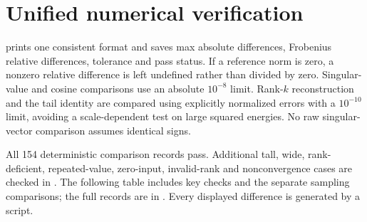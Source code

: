 \documentclass[11pt]{article}
\newcommand{\VerificationCount}{154}
\begin{document}
\section{Unified numerical verification}
 prints one consistent format and saves
max absolute differences, Frobenius relative differences, tolerance and
pass status. If a reference norm is zero, a nonzero relative difference
is left undefined rather than divided by zero.
Singular-value and cosine comparisons use an absolute $10^{-8}$ limit.
Rank-$k$ reconstruction and the tail identity are compared using
explicitly normalized errors with a $10^{-10}$ limit, avoiding a
scale-dependent test on large squared energies. No raw singular-vector
comparison assumes identical signs.

All \VerificationCount{} deterministic comparison records pass.
Additional tall, wide, rank-deficient, repeated-value, zero-input,
invalid-rank and nonconvergence cases are checked in
. The following table includes key checks
and the separate sampling comparisons; the full records are in
.
Every displayed difference is generated by a script.
\end{document}
